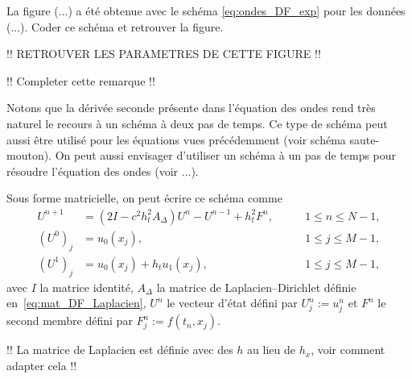 \documentclass[12pt,a4paper,twoside]{article}
\begin{document}
\begin{exercise}
  La figure (...) a \'et\'e obtenue avec le sch\'ema \eqref{eq:ondes_DF_exp}
  pour les donn\'ees (...).
  Coder ce sch\'ema et retrouver la figure.

  !! RETROUVER LES PARAMETRES DE CETTE FIGURE !!
\end{exercise}


!! Completer cette remarque !!
\begin{remark}
  Notons que la d\'eriv\'ee seconde pr\'esente dans l'\'equation des ondes 
  rend tr\`es naturel le recours \`a un sch\'ema \`a deux pas de temps.
  Ce type de sch\'ema peut aussi \^etre utilis\'e pour les \'equations vues
  pr\'ec\'edemment (voir sch\'ema saute-mouton).
  On peut aussi envisager d'utiliser un sch\'ema \`a un pas de temps
  pour r\'esoudre l'\'equation des ondes (voir ...).
\end{remark}

Sous forme matricielle, on peut \'ecrire ce sch\'ema comme
\begin{align*}
  U^{n+1}
  &= (2 I - c^2 h_t^2 A_{\Delta}) U^n - U^{n-1} + h_t^2 F^n ,
  &\qquad 1 \leq n \leq N-1 ,
  \\
  (U^0)_j
  &= u_0(x_j) ,
  & \qquad 1 \leq j \leq M-1 ,
  \\
  (U^1)_j
  &= u_0(x_j) + h_t u_1(x_j) ,
  & \qquad 1 \leq j \leq M-1 ,
\end{align*}
avec $I$ la matrice identit\'e, $A_{\Delta}$ la matrice de Laplacien--Dirichlet d\'efinie
en~\eqref{eq:mat_DF_Laplacien}, $U^n$ le vecteur d'\'etat d\'efini
par $U_j^n := u_j^n$ et $F^n$ le second membre d\'efini par $F_j^n := f(t_n,x_j)$.

!! La matrice de Laplacien est d\'efinie avec des $h$ au lieu de $h_x$, voir comment adapter cela !!
\end{document}
